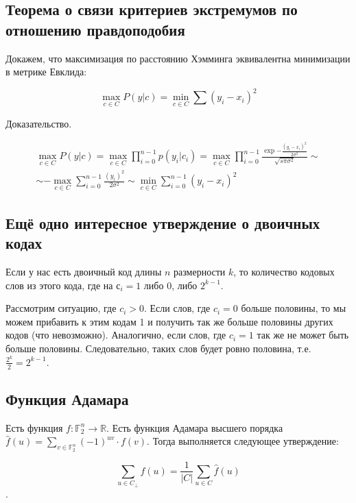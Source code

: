 \documentclass{article}
\begin{document}
\subsection*{Теорема о связи критериев экстремумов по отношению правдоподобия}

Докажем, что максимизация по расстоянию Хэмминга эквивалентна минимизации в метрике Евклида:

$$\max_{c \in C}P(y | c) = \min_{c \in C}\sum(y_i - x_i)^2$$

Доказательство.

\begin{equation*}
\begin{gathered}
\max_{c \in C} P(y | c) = \max_{c \in C} \prod_{i = 0}^{n- 1} p(y_i | c_i) = \max_{c \in C} \prod_{i = 0}^{n- 1} \frac{\exp{-\frac{(y_i - x_i)^2}{2\sigma^2}}}{\sqrt{s \pi \sigma^2}} \sim \\ \sim - \max_{c \in C} \sum_{i = 0}^{n - 1} \frac{(y_i)^2}{2\sigma^2} \sim \min_{c \in C} \sum_{i = 0}^{n - 1} (y_i - x_i)^2
\end{gathered}
\end{equation*}

\subsection*{Ещё одно интересное утверждение о двоичных кодах}

Если у нас есть двоичный код длины $n$ размерности $k$, то количество кодовых слов из этого кода, где на $с_i = 1$ либо $0$, либо $2^{k - 1}$.

Рассмотрим ситуацию, где $c_i > 0$. Если слов, где $c_i = 0$ больше половины, то мы можем прибавить к этим кодам 1 и получить так же больше половины других кодов (что невозможно). Аналогично, если слов, где $c_i = 1$ так же не может быть больше половины. Следовательно, таких слов будет ровно половина, т.е. $\frac{2^k}{2} = 2^{k - 1}$.

\subsection*{Функция Адамара}

Есть функция $f: \mathbb{F}_2^n \rightarrow \mathbb{R}$. Есть функция Адамара высшего порядка $\hat{f}(u) = \sum_{v \in \mathbb{F}_2^n}(-1)^{uv} \cdot f(v)$. Тогда выполняется следующее утверждение:

$$\sum_{u \in C_{\bot}} f(u) = \frac{1}{|C|} \sum_{u \in C} \hat{f}(u)$$.
\end{document}
